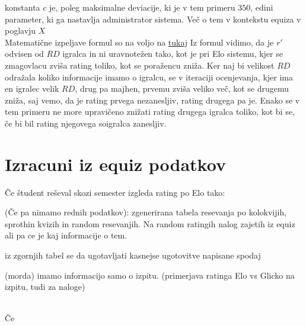 \documentclass{IEEEtran}
\begin{document}
konstanta $c$ je, poleg maksimalne deviacije, ki je v tem primeru $350$, edini parameter, ki ga nastavlja administrator sistema. Več o tem v kontekstu equiza v poglavju $X$ %
\hfill
\\
Matematične izpeljave formul so na voljo na \href{http://www.glicko.net/research/glicko.pdf}{tukaj} %
\newpage
Iz formul vidimo, da je $r'$ odvisen od $RD$ igralca in ni uravnotežen tako, kot je pri Elo sistemu, kjer se zmagovlacu zviša rating toliko, kot se poražencu zniža. Ker naj bi velikost $RD$ odražala koliko informacije imamo o igralcu, se v iteraciji ocenjevanja, kjer ima en igralec velik $RD$, drug pa majhen, prvemu zviša veliko več, kot se drugemu zniža, saj vemo, da je rating prvega nezanesljiv, rating drugega pa je. Enako se v tem primeru ne more upravičeno znižati rating drugega igralca toliko, kot bi se, če bi bil rating njegovega soigralca zanesljiv.

\hfill

\section{Izracuni iz equiz podatkov}
\label{sec:equiz}

Če študent reševal skozi semester izgleda rating po Elo tako: 

(Če pa nimamo rednih podatkov):
zgenerirana tabela resevanja po kolokvijih, sprothin kvizih in random resevanjih. Na random ratingih nalog zajetih iz equiz ali
pa ce je kaj informacije o tem.

iz zgornjih tabel se da ugotavljati kasnejse ugotovitve napisane spodaj

(morda) imamo informacijo samo o izpitu.
(primerjava ratinga Elo vs Glicko na izpitu, tudi za naloge)

\hfill
\\

Če 
\end{document}
